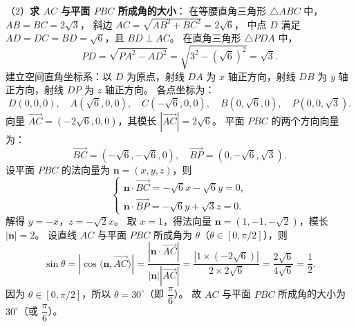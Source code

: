 \begin{answer}
（2）\textbf{求 $AC$ 与平面 $PBC$ 所成角的大小}：
在等腰直角三角形 $\triangle ABC$ 中，$AB=BC=2\sqrt{3}$，
斜边 $AC=\sqrt{AB^2+BC^2}=2\sqrt{6}$，
中点 $D$ 满足 $AD=DC=BD=\sqrt{6}$，且 $BD\perp AC$。
在直角三角形 $\triangle PDA$ 中，
\nopagebreak[4]
\[
PD=\sqrt{PA^2-AD^2}=\sqrt{3^2-(\sqrt{6})^2}=\sqrt{3}.
\]
建立空间直角坐标系：以 $D$ 为原点，射线 $DA$ 为 $x$ 轴正方向，射线 $DB$ 为 $y$ 轴正方向，射线 $DP$ 为 $z$ 轴正方向。
各点坐标为：
\nopagebreak[4]
\[
D(0,0,0),\quad A(\sqrt{6},0,0),\quad C(-\sqrt{6},0,0),\quad B(0,\sqrt{6},0),\quad P(0,0,\sqrt{3}).
\]
向量 $\overrightarrow{AC}=(-2\sqrt{6},0,0)$，其模长 $|\overrightarrow{AC}|=2\sqrt{6}$。
平面 $PBC$ 的两个方向向量为：
\nopagebreak[4]
\[
\overrightarrow{BC}=(-\sqrt{6},-\sqrt{6},0),\quad \overrightarrow{BP}=(0,-\sqrt{6},\sqrt{3}).
\]
设平面 $PBC$ 的法向量为 $\boldsymbol{n}=(x,y,z)$，则
\nopagebreak[4]
\[
\begin{cases}
\boldsymbol{n}\cdot\overrightarrow{BC}=-\sqrt{6}x-\sqrt{6}y=0,\\
\boldsymbol{n}\cdot\overrightarrow{BP}=-\sqrt{6}y+\sqrt{3}z=0.
\end{cases}
\]
解得 $y=-x$，$z=-\sqrt{2}x$。
取 $x=1$，得法向量 $\boldsymbol{n}=(1,-1,-\sqrt{2})$，模长 $|\boldsymbol{n}|=2$。
设直线 $AC$ 与平面 $PBC$ 所成角为 $\theta$（$\theta\in[0,\pi/2]$），则
\nopagebreak[4]
\[
\sin\theta=|\cos\langle\boldsymbol{n},\overrightarrow{AC}\rangle|=\frac{|\boldsymbol{n}\cdot\overrightarrow{AC}|}{|\boldsymbol{n}||\overrightarrow{AC}|}=\frac{|1\times(-2\sqrt{6})|}{2\times 2\sqrt{6}}=\frac{2\sqrt{6}}{4\sqrt{6}}=\frac{1}{2}.
\]
因为 $\theta\in[0,\pi/2]$，所以 $\theta=30^\circ$（即 $\dfrac{\pi}{6}$）。
故 $AC$ 与平面 $PBC$ 所成角的大小为 $30^\circ$（或 $\dfrac{\pi}{6}$）。


\end{answer}
